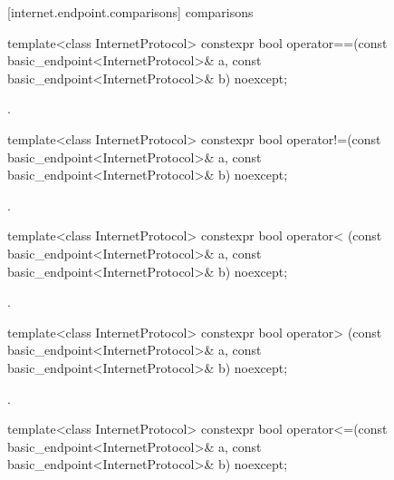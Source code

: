 [internet.endpoint.comparisons]{ comparisons}

\begin{itemdecl}
template<class InternetProtocol>
  constexpr bool operator==(const basic_endpoint<InternetProtocol>& a,
                            const basic_endpoint<InternetProtocol>& b) noexcept;
\end{itemdecl}

\begin{itemdescr}
\pnum
\returns {}.
\end{itemdescr}

\begin{itemdecl}
template<class InternetProtocol>
  constexpr bool operator!=(const basic_endpoint<InternetProtocol>& a,
                            const basic_endpoint<InternetProtocol>& b) noexcept;
\end{itemdecl}

\begin{itemdescr}
\pnum
\returns {}.
\end{itemdescr}

\begin{itemdecl}
template<class InternetProtocol>
  constexpr bool operator< (const basic_endpoint<InternetProtocol>& a,
                            const basic_endpoint<InternetProtocol>& b) noexcept;
\end{itemdecl}

\begin{itemdescr}
\pnum
\returns {}.
\end{itemdescr}

\begin{itemdecl}
template<class InternetProtocol>
  constexpr bool operator> (const basic_endpoint<InternetProtocol>& a,
                            const basic_endpoint<InternetProtocol>& b) noexcept;
\end{itemdecl}

\begin{itemdescr}
\pnum
\returns {}.
\end{itemdescr}

\begin{itemdecl}
template<class InternetProtocol>
  constexpr bool operator<=(const basic_endpoint<InternetProtocol>& a,
                            const basic_endpoint<InternetProtocol>& b) noexcept;
\end{itemdecl}

